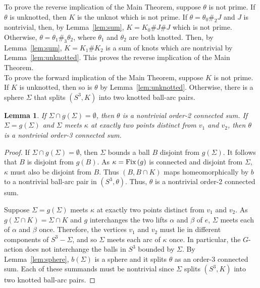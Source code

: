 \documentclass{amsart}
\numberwithin{equation}{section}
\newtheorem{lemma}[theorem]{Lemma}
\theoremstyle{definition}
\newcommand{\pa}[1]{\left(#1\right)}
\newcommand{\tn}[1]{\textnormal{#1}}
\begin{document}
To prove the reverse implication of the Main Theorem,
suppose $\theta$ is not prime.
If $\theta$ is unknotted, then $K$ is the unknot which is not prime.
If $\theta=\theta_0\#_2J$ and $J$ is nontrivial, then, by Lemma~\ref{lem:sum}, $K=K_0\#J\#J$ which is not prime.
Otherwise, $\theta=\theta_1\#_3\theta_2$, where $\theta_1$ and $\theta_2$ are both knotted.
Then, by Lemma~\ref{lem:sum}, $K=K_1\#K_2$ is a sum of knots which are nontrivial by Lemma~\ref{lem:unknotted}. This proves the reverse implication of the Main Theorem.\\

To prove the forward implication of the Main Theorem, suppose $K$ is not prime. If $K$ is unknotted, then so is $\theta$ by Lemma~\ref{lem:unknotted}. Otherwise, there is a sphere $\Sigma$ that splits $(S^3,K)$ into two knotted ball-arc pairs.

\begin{lemma}\label{lem:connect_sum}
If $\Sigma\cap g(\Sigma)=\emptyset$, then $\theta$ is a nontrivial order-2 connected sum.
If $\Sigma=g(\Sigma)$ and $\Sigma$ meets $\kappa$ at exactly two points distinct from $v_1$ and $v_2$, then $\theta$ is a nontrivial order-3 connected sum.
\end{lemma}
\begin{proof}
If $\Sigma\cap g(\Sigma)=\emptyset$, then $\Sigma$ bounds a ball $B$ disjoint from $g(\Sigma)$. 
It follows that $B$ is disjoint from $g(B)$.
As $\kappa=\tn{Fix}\pa g$ is connected and disjoint from $\Sigma$, $\kappa$ must also be disjoint from $B$. Thus $(B,B\cap K)$ maps homeomorphically by $b$ to a nontrivial ball-arc pair in $(S^3,\theta)$.
Thus, $\theta$ is a nontrivial order-2 connected sum.

Suppose $\Sigma=g(\Sigma)$ meets $\kappa$ at exactly two points distinct from $v_1$ and $v_2$. 
As $g(\Sigma\cap K)=\Sigma\cap K$ and $g$ interchanges the two lifts $\alpha$ and $\beta$ of $e$, $\Sigma$ meets each of $\alpha$ and $\beta$ once.
Therefore, the vertices $v_1$ and $v_2$ must lie in different components of $S^3-\Sigma$, and so $\Sigma$ meets each arc of $\kappa$ once.
In particular, the $G$-action does not interchange the balls in $S^3$ bounded by $\Sigma$.
By Lemma~\ref{lem:sphere}, $b(\Sigma)$ is a sphere and it splits $\theta$ as an order-3 connected sum.
Each of these summands must be nontrivial since $\Sigma$ splits $(S^3,K)$ into two knotted ball-arc pairs.
\end{proof}
\end{document}
